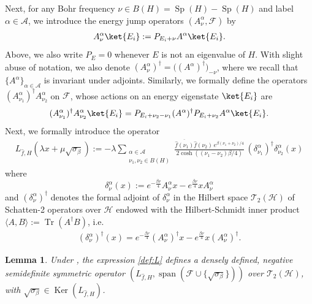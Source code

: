 \documentclass[11pt]{amsart}
\newcommand{\1}{\mathbbm{1}}
\newcommand{\Tr}{\operatorname{Tr}}
\newcommand{\cH}{\mathcal{H}}
\theoremstyle{plain}
\newtheorem{lemma}[theorem]{Lemma}
\theoremstyle{definition}
\theoremstyle{remark}
\numberwithin{equation}{section}
\begin{document}
\noindent 
Next, for any Bohr frequency $\nu\in B(H)=\operatorname{Sp}(H)-\operatorname{Sp}(H)$ and label $\alpha\in\mathcal{A}$, we introduce the energy jump operators $(A^\alpha_\nu,\mathcal{F})$ by
\begin{align*}
A^\alpha_\nu\ket{E_i}:=P_{E_i+\nu}A^\alpha\ket{E_i}.
\end{align*}
Above, we also write $P_E=0$ whenever $E$ is not an eigenvalue of $H$.
With slight abuse of notation, we also denote $(A^\alpha_\nu)^\dagger=\big((A^\alpha)^\dagger\big)_{-\nu}$, where we recall that $\{A^\alpha\}_{\alpha\in\mathcal{A}}$ is invariant under adjoints. Similarly, we formally define the operators $(A^\alpha_{\nu_1})^\dagger A^\alpha_{\nu_2}$ on $\mathcal{F}$, whose actions on an energy eigenstate $\ket{E_i}$ are
\begin{align*}
(A^\alpha_{\nu_1})^\dagger A^\alpha_{\nu_2}\ket{E_i}=P_{E_i+\nu_2-\nu_1}(A^\alpha)^\dagger P_{E_i+\nu_2}A^\alpha\ket{E_i}.
\end{align*}
Next, we formally introduce the operator
\begin{align}\label{def:L}
L_{\widehat{f},H}(\lambda x+\mu\sqrt{\sigma_\beta})\!:=-\lambda \sum_{\substack{\alpha\in\mathcal{A}\\\nu_1,\nu_2\in B(H)}}\frac{\overline{\widehat{f}(\nu_1)}\widehat{f}(\nu_2)\,e^{\beta(\nu_1+\nu_2)/4}}{2\cosh((\nu_1-\nu_2)\beta/4)}\,(\delta^\alpha_{\nu_1})^{\dagger}\delta^\alpha_{\nu_2}(x)
\end{align}
where 
\begin{equation}
\label{eq:delta}\delta^\alpha_\nu(x):=e^{-\frac{\beta \nu}{4}}A^\alpha_\nu x-e^{\frac{\beta\nu}{4}}xA^\alpha_\nu
\end{equation}
and $(\delta_\nu^\alpha)^{\dagger}$ denotes the formal adjoint of $\delta^\alpha_\nu$ in the Hilbert space $\mathscr{T}_2(\mathcal{H})$ of Schatten-2 operators over $\cH$ endowed with the Hilbert-Schmidt inner product $\langle A,B\rangle:=\Tr(A^\dagger B)$, i.e.
\begin{align*}
(\delta^\alpha_{\nu})^\dagger(x)=e^{-\frac{\beta\nu}{4}}(A^\alpha_\nu)^\dagger x-e^{\frac{\beta\nu}{4}}x(A^\alpha_\nu)^\dagger.
\end{align*}


 \begin{lemma}\label{lem:definL}
 Under , the expression \eqref{def:L} defines a densely defined, negative semidefinite symmetric operator $(L_{\widehat{f},H},\operatorname{span}(\mathscr{F}\cup \{\sqrt{\sigma_\beta}\}))$ over $\mathscr{T}_2(\mathcal{H})$, with $\sqrt{\sigma_\beta}\in \operatorname{Ker}(L_{\widehat{f},H})$.
 \end{lemma}
 
\end{document}
